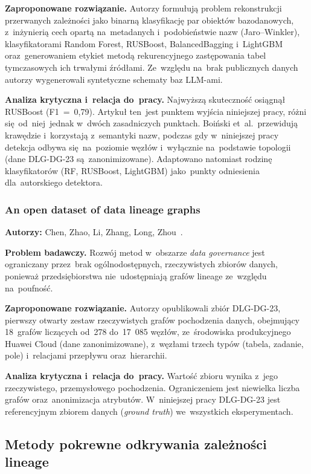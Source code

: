\documentclass[polish,master,a4paper,oneside]{ppfcmthesis}
\renewcommand{\_}{\origtextunderscore\ifmmode\else\allowbreak\fi}
\begin{document}
\noindent\textbf{Zaproponowane rozwiązanie.}
Autorzy formułują problem rekonstrukcji przerwanych zależności jako binarną
klasyfikację par obiektów bazodanowych, z~inżynierią cech opartą na~metadanych
i~podobieństwie nazw (Jaro–Winkler), klasyfikatorami Random Forest, RUSBoost,
BalancedBagging i~LightGBM oraz~generowaniem etykiet metodą rekurencyjnego
zastępowania tabel tymczasowych ich trwałymi źródłami. Ze~względu na~brak
publicznych danych autorzy wygenerowali syntetyczne schematy baz LLM-ami.

\noindent\textbf{Analiza krytyczna i~relacja do~pracy.}
Najwyższą skuteczność osiągnął RUSBoost (F1~=~0{,}79). Artykuł ten~jest
punktem wyjścia niniejszej pracy, różni się~od~niej~jednak w~dwóch
zasadniczych punktach. Boiński et~al.\ przewidują krawędzie
i~korzystają z~semantyki nazw, podczas gdy w~niniejszej pracy detekcja
odbywa się~na~poziomie węzłów i~wyłącznie na~podstawie topologii
(dane DLG-DG-23 są~zanonimizowane).
Adaptowano natomiast rodzinę klasyfikatorów (RF, RUSBoost, LightGBM)
jako~punkty odniesienia dla~autorskiego detektora.

\subsubsection{An open dataset of data lineage graphs}
\noindent\textbf{Autorzy:} Chen, Zhao, Li, Zhang, Long, Zhou~\cite{Chen2024}.

\noindent\textbf{Problem badawczy.}
Rozwój metod w~obszarze \emph{data governance} jest ograniczany przez~brak
ogólnodostępnych, rzeczywistych zbiorów danych, ponieważ przedsiębiorstwa nie~udostępniają
grafów lineage ze~względu na~poufność.

\noindent\textbf{Zaproponowane rozwiązanie.}
Autorzy opublikowali zbiór DLG-DG-23, pierwszy otwarty zestaw rzeczywistych
grafów pochodzenia danych, obejmujący 18~grafów liczących od~278 do~17~085 węzłów,
ze~środowiska produkcyjnego Huawei Cloud (dane zanonimizowane), z~węzłami
trzech typów (tabela, zadanie, pole) i~relacjami przepływu oraz~hierarchii.

\noindent\textbf{Analiza krytyczna i~relacja do~pracy.}
Wartość zbioru wynika z~jego rzeczywistego, przemysłowego pochodzenia.
Ograniczeniem jest niewielka liczba grafów oraz~anonimizacja atrybutów.
W~niniejszej pracy DLG-DG-23 jest referencyjnym zbiorem danych
(\emph{ground truth}) we~wszystkich eksperymentach.

\subsection{Metody pokrewne odkrywania zależności lineage}
\end{document}
